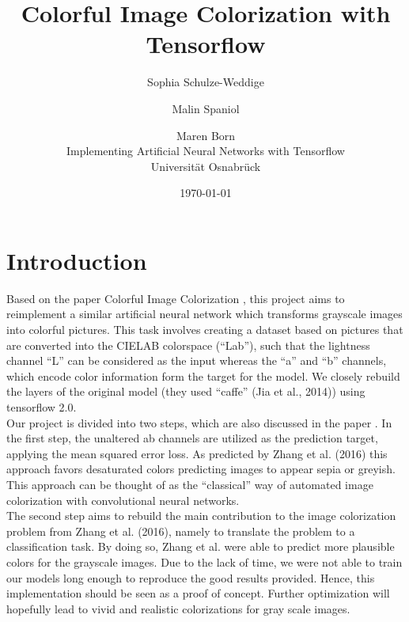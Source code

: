 \documentclass[12pt,letterpaper]{article}
\title{Colorful Image Colorization with Tensorflow}
\date{\today}
\author{Sophia Schulze-Weddige \and Malin Spaniol \and Maren Born \\Implementing Artificial Neural Networks with Tensorflow \\Universität Osnabrück}
\begin{document}
\maketitle
\thispagestyle{empty}
\newpage
\thispagestyle{empty}
\tableofcontents
\newpage
\section{Introduction}
Based on the paper Colorful Image Colorization \citep{Zhang.2016}, this project aims to reimplement a similar artificial neural network which transforms grayscale images into colorful pictures. This task involves creating a dataset based on pictures that are converted into the CIELAB colorspace (\enquote{Lab}), such that the lightness channel \enquote{L} can be considered as the input whereas the \enquote{a} and \enquote{b} channels, which encode color information form the target for the model. We closely rebuild the layers of the original model (they used \enquote{caffe} (Jia et al., 2014)) using tensorflow 2.0.\\
Our project is divided into two steps, which are also discussed in the paper \citep{Zhang.2016}. In the first step, the unaltered ab channels are utilized as the prediction target, applying the mean squared error loss. As predicted by Zhang et al. (2016) this approach favors desaturated colors predicting images to appear sepia or greyish. This approach can be thought of as the \enquote{classical} way of automated image colorization with convolutional neural networks.\\
The second step aims to rebuild the main contribution to the image colorization problem from Zhang et al. (2016), namely to translate the problem to a classification task. By doing so, Zhang et al. were able to predict more plausible colors for the grayscale images. Due to the lack of time, we were not able to train our models long enough to reproduce the good results provided. Hence, this implementation should be seen as a proof of concept. Further optimization will hopefully lead to vivid and realistic colorizations for gray scale images.
\end{document}
